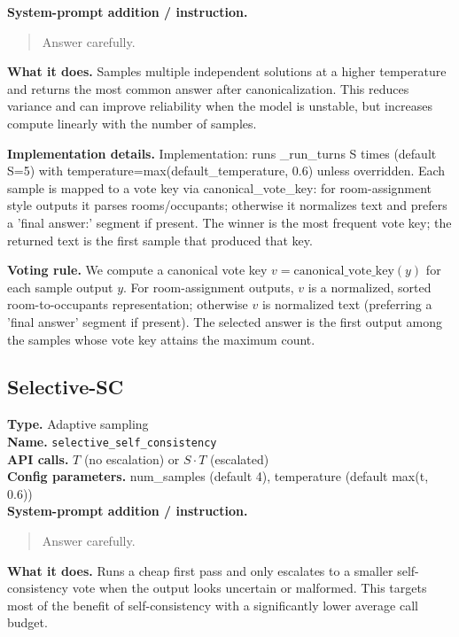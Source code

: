 \documentclass[10pt,twocolumn]{article}
\begin{document}
\noindent\textbf{System-prompt addition / instruction.}
\begin{quote}\footnotesize
Answer carefully.
\end{quote}
\noindent\textbf{What it does.} Samples multiple independent solutions at a higher temperature and returns the most common answer after canonicalization. This reduces variance and can improve reliability when the model is unstable, but increases compute linearly with the number of samples.

\noindent\textbf{Implementation details.} Implementation: runs \_run\_turns S times (default S=5) with temperature=max(default\_temperature, 0.6) unless overridden. Each sample is mapped to a vote key via canonical\_vote\_key: for room-assignment style outputs it parses rooms/occupants; otherwise it normalizes text and prefers a 'final answer:' segment if present. The winner is the most frequent vote key; the returned text is the first sample that produced that key.

\noindent\textbf{Voting rule.} We compute a canonical vote key $v=\mathrm{canonical\_vote\_key}(y)$ for each sample output $y$. For room-assignment outputs, $v$ is a normalized, sorted room-to-occupants representation; otherwise $v$ is normalized text (preferring a 'final answer' segment if present). The selected answer is the first output among the samples whose vote key attains the maximum count.

\subsection*{Selective-SC}
\noindent\textbf{Type.} Adaptive sampling\\
\textbf{Name.} \texttt{selective\_\hspace{0pt}self\_\hspace{0pt}consistency}\\
\textbf{API calls.} $T$ (no escalation) or $S \cdot T$ (escalated)\\
\textbf{Config parameters.} num\_samples (default 4), temperature (default max(t, 0.6))\\

\noindent\textbf{System-prompt addition / instruction.}
\begin{quote}\footnotesize
Answer carefully.
\end{quote}
\noindent\textbf{What it does.} Runs a cheap first pass and only escalates to a smaller self-consistency vote when the output looks uncertain or malformed. This targets most of the benefit of self-consistency with a significantly lower average call budget.
\end{document}
